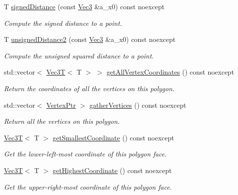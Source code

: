 \begin{DoxyCompactItemize}
T \hyperlink{classDcel_1_1FaceT_a8ac718b0c9af797d34efcda43f38b6c0}{signed\+Distance} (const \hyperlink{classDcel_1_1FaceT_ade9c182834ec6f18a0e17b8140308db2}{Vec3} \&a\+\_\+x0) const noexcept
\begin{DoxyCompactList}\small\item\em Compute the signed distance to a point. \end{DoxyCompactList}\item 
T \hyperlink{classDcel_1_1FaceT_a2915506b12c361eb4a25cba80638cb7d}{unsigned\+Distance2} (const \hyperlink{classDcel_1_1FaceT_ade9c182834ec6f18a0e17b8140308db2}{Vec3} \&a\+\_\+x0) const noexcept
\begin{DoxyCompactList}\small\item\em Compute the unsigned squared distance to a point. \end{DoxyCompactList}\item 
std\+::vector$<$ \hyperlink{classVec3T}{Vec3T}$<$ T $>$ $>$ \hyperlink{classDcel_1_1FaceT_a17f38028d7bd3150feb22484e601f557}{get\+All\+Vertex\+Coordinates} () const noexcept
\begin{DoxyCompactList}\small\item\em Return the coordinates of all the vertices on this polygon. \end{DoxyCompactList}\item 
std\+::vector$<$ \hyperlink{classDcel_1_1FaceT_a9c22745bf7351c3bfba27d5816a50deb}{Vertex\+Ptr} $>$ \hyperlink{classDcel_1_1FaceT_aba1c0e341f18097112fd55465cc00eeb}{gather\+Vertices} () const noexcept
\begin{DoxyCompactList}\small\item\em Return all the vertices on this polygon. \end{DoxyCompactList}\item 
\mbox{\label{classDcel_1_1FaceT_a8eb0b35ecb5de2601dc9f7ff0d2cac0d}} 
\hyperlink{classVec3T}{Vec3T}$<$ T $>$ \hyperlink{classDcel_1_1FaceT_a8eb0b35ecb5de2601dc9f7ff0d2cac0d}{get\+Smallest\+Coordinate} () const noexcept
\begin{DoxyCompactList}\small\item\em Get the lower-\/left-\/most coordinate of this polygon face. \end{DoxyCompactList}\item 
\mbox{\label{classDcel_1_1FaceT_ad712b8dec98d77e631e1c7a920424d1f}} 
\hyperlink{classVec3T}{Vec3T}$<$ T $>$ \hyperlink{classDcel_1_1FaceT_ad712b8dec98d77e631e1c7a920424d1f}{get\+Highest\+Coordinate} () const noexcept
\begin{DoxyCompactList}\small\item\em Get the upper-\/right-\/most coordinate of this polygon face. \end{DoxyCompactList}\end{DoxyCompactItemize}
